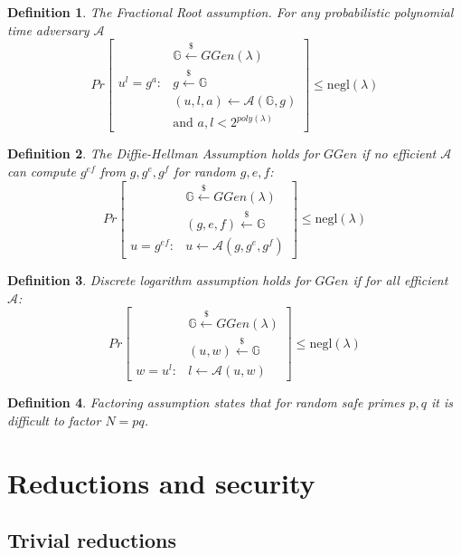 \documentclass[a4paper]{article}
\newtheorem{definition}{Definition}
\begin{document}
\begin{definition}
The \emph{Fractional Root assumption}. For any probabilistic polynomial time adversary $\mathcal{A}$ 
$$
Pr
\begin{bmatrix}
&\mathbb{G}\xleftarrow{\$}GGen(\lambda)\\
u^l = g^{a} : & g \xleftarrow{\$}\mathbb{G}\\
& (u,l,a)  \xleftarrow{} \mathcal{A}(\mathbb{G},g)\\
& \text{and }a,l<2^{poly(\lambda)}
\end{bmatrix}\leq \mathrm{negl}(\lambda)
$$

\end{definition}

\begin{definition}
The \emph{Diffie-Hellman Assumption} holds for
$GGen$ if no  efficient $\mathcal{A}$ can compute $g^{ef}$ from $g,g^e,g^f$ for random $g,e,f$:
$$
Pr
\begin{bmatrix}
&\mathbb{G}\xleftarrow{\$}GGen(\lambda)\\
& (g,e,f)\xleftarrow{\$}\mathbb{G}\\
u = g^{ef} :&  u \xleftarrow{} \mathcal{A}(g,g^e,g^f)
\end{bmatrix}\leq \mathrm{negl}(\lambda)
$$
\end{definition}

\begin{definition}
\emph{Discrete logarithm}  assumption 
holds for
$GGen$ if for all  efficient $\mathcal{A}$:
$$
Pr
\begin{bmatrix}
&\mathbb{G}\xleftarrow{\$}GGen(\lambda)\\
& (u,w)\xleftarrow{\$}\mathbb{G}\\
w = u^l :&  l \xleftarrow{} \mathcal{A}(u,w)
\end{bmatrix}\leq \mathrm{negl}(\lambda)
$$
\end{definition}

\begin{definition}
\emph{Factoring}  assumption states that for random safe primes $p,q$ it is difficult to factor $N=pq$.
\end{definition}


\section{Reductions and security}

\subsection{Trivial reductions}
\end{document}
